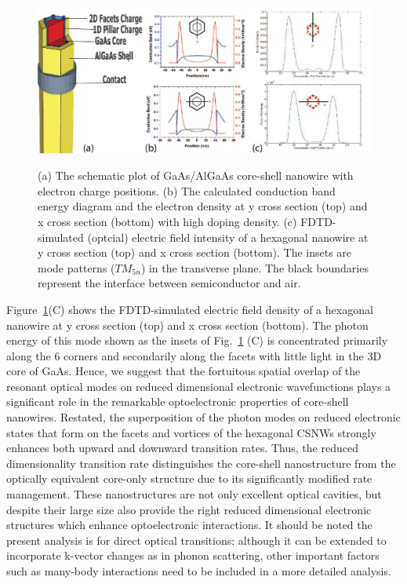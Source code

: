 \begin{figure}
  \caption[The schematic plot of GaAs/AlGaAs core-shell nanowire electron charge distribution with band bending, and the FTDT-simulated (optical) electric field intensity distribution.]{(a) The schematic plot of GaAs/AlGaAs core-shell nanowire with electron charge positions. (b) The calculated conduction band energy diagram and the electron density at y cross section (top) and x cross section (bottom) with high doping density. (c) FDTD-simulated (optcial) electric field intensity of a hexagonal nanowire at y cross section (top) and x cross section (bottom). The insets are mode patterns ($TM_{5n}$) in the transverse plane. The black boundaries represent the interface between semiconductor and air.}
  \centering
  \includegraphics[width=\textwidth]{pictures/ED/Photoncharge}
  \label{PhotonCharge}
\end{figure}

Figure~\ref{PhotonCharge}(C) shows the FDTD-simulated electric field density
of a hexagonal nanowire at y cross section (top) and x cross section (bottom).
The photon energy of this mode shown as the insets of Fig.~\ref{PhotonCharge}
(C) is concentrated primarily along the 6 corners and secondarily along the
facets with little light in the 3D core of GaAs. Hence, we suggest that the
fortuitous spatial overlap of the resonant optical modes on reduced dimensional
electronic wavefunctions plays a significant role in the remarkable
optoelectronic properties of core-shell nanowires. Restated, the superposition
of the photon modes on reduced electronic states that form on the facets and
vortices of the hexagonal CSNWs strongly enhances both upward and downward
transition rates. Thus, the reduced dimensionality transition rate
distinguishes the core-shell nanostructure from the optically equivalent
core-only structure due to its significantly modified rate management. These
nanostructures are not only excellent optical cavities, but despite their large
size also provide the right reduced dimensional electronic structures which
enhance optoelectronic interactions. It should be noted the present analysis
is for direct optical transitions; although it can be extended to incorporate
k-vector changes as in phonon scattering, other important factors such as
many-body interactions need to be included in a more detailed analysis.

